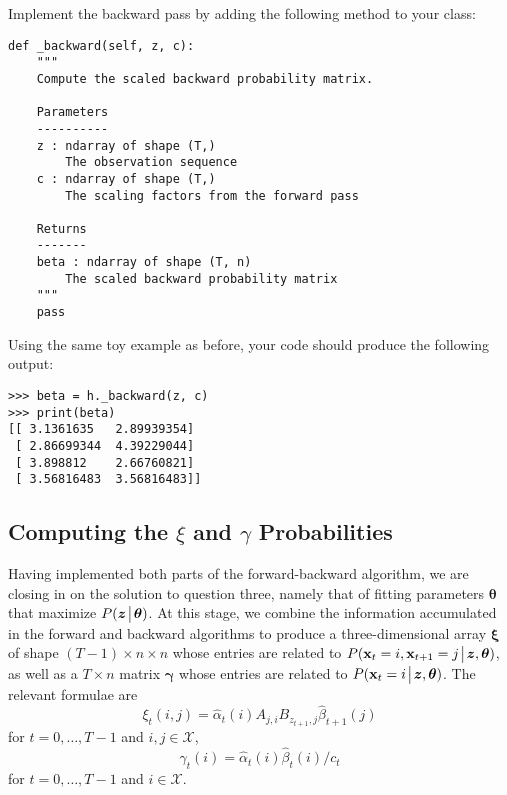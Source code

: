 
\begin{problem}
Implement the backward pass by adding the following method to your class:
\begin{lstlisting}
def _backward(self, z, c):
    """
    Compute the scaled backward probability matrix.

    Parameters
    ----------
    z : ndarray of shape (T,)
        The observation sequence
    c : ndarray of shape (T,)
        The scaling factors from the forward pass

    Returns
    -------
    beta : ndarray of shape (T, n)
        The scaled backward probability matrix
    """
    pass
\end{lstlisting}
Using the same toy example as before, your code should produce the following output:
\begin{lstlisting}
>>> beta = h._backward(z, c)
>>> print(beta)
[[ 3.1361635   2.89939354]
 [ 2.86699344  4.39229044]
 [ 3.898812    2.66760821]
 [ 3.56816483  3.56816483]]
\end{lstlisting}
\end{problem}

\subsection*{Computing the $\xi$ and $\gamma$ Probabilities}
Having implemented both parts of the forward-backward algorithm, we are closing in on the solution to question three, namely that of fitting parameters $\boldsymbol\theta$ that maximize $P(\boldsymbol z \!\mathrel{\big|}\! \boldsymbol\theta)$.
At this stage, we combine the information accumulated in the forward and backward algorithms to produce a three-dimensional array $\boldsymbol\xi$
of shape $(T-1)\times n \times n$ whose entries are related to $P(\mathbf{x}_t = i, \mathbf{x}_{t+1} = j \!\mathrel{\big|}\! \boldsymbol z, \boldsymbol\theta)$, as well as
a $T \times n$ matrix $\boldsymbol\gamma$ whose entries are related to $P(\mathbf{x}_t=i \!\mathrel{\big|}\! \boldsymbol z, \boldsymbol\theta)$.
The relevant formulae are
\[
\xi_{t}(i,j) = \widehat{\alpha}_t(i)A_{j,i}B_{z_{t+1},j}\widehat{\beta}_{t+1}(j)
\]
for $t = 0, \ldots, T-1$ and $i,j \in \mathscr{X}$,
\[
\gamma_{t}(i) = \widehat{\alpha}_t(i)\widehat{\beta}_t(i)/c_t
\]
for $t = 0,\ldots,T-1$ and $i \in \mathscr{X}$. %

